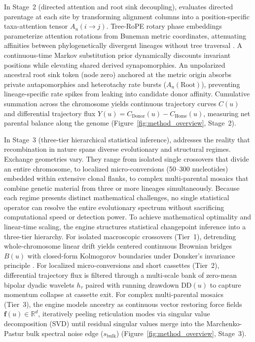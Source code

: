 In Stage~2 (directed attention and root sink decoupling), \RhizAeon evaluates directed parentage at each site by transforming alignment columns into a position-specific taxa-attention tensor $A_u(i \to j)$.
Tree-RoPE rotary phase embeddings parameterize attention rotations from Buneman metric coordinates, attenuating affinities between phylogenetically divergent lineages without tree traversal \citep{su2024roformer}.
A continuous-time Markov substitution prior dynamically discounts invariant positions while elevating shared derived synapomorphies.
An unpolarized ancestral root sink token (node zero) anchored at the metric origin absorbs private autapomorphies and heterotachy rate bursts ($A_u(\text{Root})$), preventing lineage-specific rate spikes from leaking into candidate donor affinity.
Cumulative summation across the chromosome yields continuous trajectory curves $C(u)$ and differential trajectory flux $Y(u) = C_{\text{Donor}}(u) - C_{\text{Home}}(u)$, measuring net parental balance along the genome (Figure~\ref{fig:method_overview}, Stage~2).

In Stage~3 (three-tier hierarchical statistical inference), \RhizAeon addresses the reality that recombination in nature spans diverse evolutionary and structural regimes.
Exchange geometries vary.
They range from isolated single crossovers that divide an entire chromosome, to localized micro-conversions (50--300 nucleotides) embedded within extensive clonal flanks, to complex multi-parental mosaics that combine genetic material from three or more lineages simultaneously.
Because each regime presents distinct mathematical challenges, no single statistical operator can resolve the entire evolutionary spectrum without sacrificing computational speed or detection power.
To achieve mathematical optimality and linear-time scaling, the engine structures statistical changepoint inference into a three-tier hierarchy.
For isolated macroscopic crossovers (Tier~1), detrending whole-chromosome linear drift yields centered continuous Brownian bridges $B(u)$ with closed-form Kolmogorov boundaries under Donsker's invariance principle \citep{donsker1951invariance}.
For localized micro-conversions and short cassettes (Tier~2), differential trajectory flux is filtered through a multi-scale bank of zero-mean bipolar dyadic wavelets $h_\tau$ paired with running drawdown $\text{DD}(u)$ to capture momentum collapse at cassette exit.
For complex multi-parental mosaics (Tier~3), the engine models ancestry as continuous vector restoring force fields $\mathbf{f}(u) \in \mathbb{R}^d$, iteratively peeling reticulation modes via singular value decomposition (SVD) until residual singular values merge into the Marchenko-Pastur bulk spectral noise edge ($s_{\text{bulk}}$) \citep{marchenko1967distribution} (Figure~\ref{fig:method_overview}, Stage~3).

